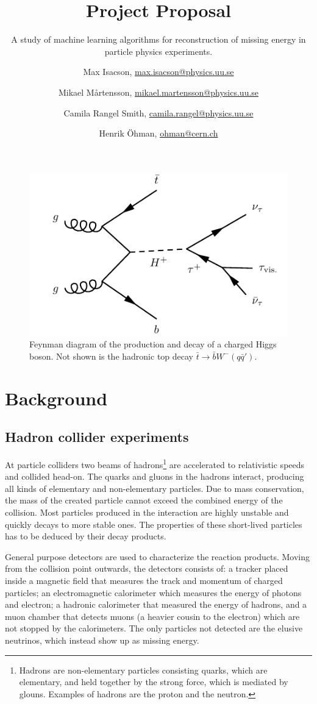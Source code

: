 \documentclass{scrartcl}
\title{Project Proposal}
\subtitle{A study of machine learning algorithms for reconstruction of missing energy in particle physics experiments.}
\author{
  Max Isacson, \url{max.isacson@physics.uu.se}
  \and
  Mikael M\aa rtensson, \url{mikael.martensson@physics.uu.se}
  \and
  Camila Rangel Smith, \url{camila.rangel@physics.uu.se}
  \and
  Henrik Öhman, \url{ohman@cern.ch}
}
\begin{document}
\maketitle

\begin{figure}
    \centering
    \includegraphics[width=.7\textwidth]{img/heavyHplustaunu4fs.pdf}
    \caption{Feynman diagram of the production and decay of a charged Higgs boson. Not shown is the hadronic top decay $\bar t \to \bar b W^-(q \bar q')$.}\label{fig:hplus}
\end{figure}

\section{Background}
\subsection{Hadron collider experiments}
At particle colliders two beams of hadrons\footnote{Hadrons are non-elementary particles consisting quarks, which are elementary, and held together by the strong force, which is mediated by glouns. Examples of hadrons are the proton and the neutron.} are accelerated to relativistic speeds and collided head-on. The quarks and gluons in the hadrons interact, producing all kinds of elementary and non-elementary particles. Due to mass conservation, the mass of the created particle cannot exceed the combined energy of the collision. Most particles produced in the interaction are highly unstable and quickly decays to more stable ones. The properties of these short-lived particles has to be deduced by their decay products.

General purpose detectors are used to characterize the reaction products. Moving from the collision point outwards, the detectors consists of: a tracker placed inside a magnetic field that measures the track and momentum of charged particles; an electromagnetic calorimeter which measures the energy of photons and electron; a hadronic calorimeter that measured the energy of hadrons, and a muon chamber that detects muons (a heavier cousin to the electron) which are not stopped by the calorimeters. The only particles not detected are the elusive neutrinos, which instead show up as missing energy.
\end{document}
